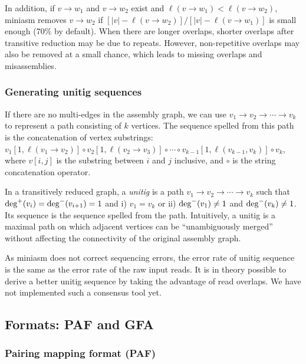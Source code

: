 \documentclass{bioinfo}
\begin{document}
\begin{methods}
In addition, if $v\to w_1$ and $v\to w_2$ exist and $\ell(v\to w_1)<\ell(v\to
w_2)$, miniasm removes $v\to w_2$ if $[|v|-\ell(v\to w_2)]/[|v|-\ell(v\to
w_1)]$ is small enough (70\% by default). When there are longer overlaps,
shorter overlaps after transitive reduction may be due to repeats.
However, non-repetitive overlaps may also be removed at a small chance, which
leads to missing overlaps and misassemblies.

\subsubsection{Generating unitig sequences}

If there are no multi-edges in the assembly graph, we can use $v_1\to
v_2\to\cdots\to v_k$ to represent a path consisting of $k$ vertices. The
sequence spelled from this path is the concatenation of vertex substrings:
$v_1[1,\ell(v_1\to v_2)]\circ v_2[1,\ell(v_2\to v_3)]\circ\cdots\circ
v_{k-1}[1,\ell(v_{k-1},v_k)]\circ v_k$, where $v[i,j]$ is the substring between
$i$ and $j$ inclusive, and $\circ$ is the string concatenation operator.

In a transitively reduced graph, a \emph{unitig} is a path $v_1\to
v_2\to\cdots\to v_k$ such that ${\rm deg}^+(v_i)={\rm deg}^-(v_{i+1})=1$ and i)
$v_1=v_k$ or ii) ${\rm deg}^-(v_1)\not=1$ and ${\rm deg}^-(v_k)\not=1$.
Its sequence is the sequence spelled from the path. Intuitively, a unitig is a
maximal path on which adjacent vertices can be ``unambiguously merged'' without
affecting the connectivity of the original assembly graph.

As miniasm does not correct sequencing errors, the error rate of unitig
sequence is the same as the error rate of the raw input reads. It is in theory
possible to derive a better unitig sequence by taking the advantage of read
overlaps. We have not implemented such a consensus tool yet.

\subsection{Formats: PAF and GFA}

\subsubsection{Pairing mapping format (PAF)}


\end{methods}
\end{document}
